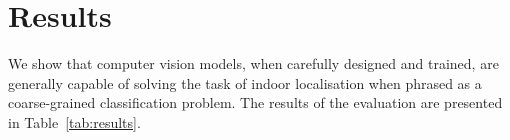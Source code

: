 \documentclass[a4paper]{article}
\begin{document}


  \section{Results} %
  \label{sec:results}


  We show that computer vision models, when carefully designed and trained, are
  generally capable of solving the task of indoor localisation when phrased as a
  coarse-grained classification problem. The results of the evaluation are
  presented in Table~\ref{tab:results}.
\end{document}

